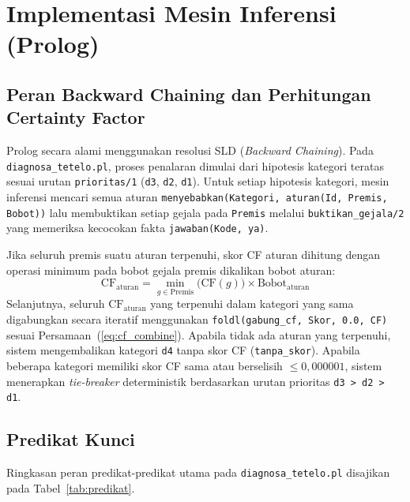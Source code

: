 \documentclass[12pt,a4paper]{report}
\begin{document}
\section{Implementasi Mesin Inferensi (Prolog)}

\subsection{Peran Backward Chaining dan Perhitungan Certainty Factor}
Prolog secara alami menggunakan resolusi SLD (\textit{Backward Chaining}). Pada \texttt{diagnosa\_tetelo.pl}, proses penalaran dimulai dari hipotesis kategori teratas sesuai urutan \texttt{prioritas/1} (\texttt{d3}, \texttt{d2}, \texttt{d1}). Untuk setiap hipotesis kategori, mesin inferensi mencari semua aturan \texttt{menyebabkan(Kategori, aturan(Id, Premis, Bobot))} lalu membuktikan setiap gejala pada \texttt{Premis} melalui \texttt{buktikan\_gejala/2} yang memeriksa kecocokan fakta \texttt{jawaban(Kode, ya)}.

Jika seluruh premis suatu aturan terpenuhi, skor CF aturan dihitung dengan operasi minimum pada bobot gejala premis dikalikan bobot aturan:
\begin{equation}
  \text{CF}_{\text{aturan}} = \min_{g \in \text{Premis}}\bigl(\text{CF}(g)\bigr) \times \text{Bobot}_{\text{aturan}}
  \label{eq:cf_rule}
\end{equation}
Selanjutnya, seluruh $\text{CF}_{\text{aturan}}$ yang terpenuhi dalam kategori yang sama digabungkan secara iteratif menggunakan \texttt{foldl(gabung\_cf, Skor, 0.0, CF)} sesuai Persamaan~(\ref{eq:cf_combine}). Apabila tidak ada aturan yang terpenuhi, sistem mengembalikan kategori \texttt{d4} tanpa skor CF (\texttt{tanpa\_skor}). Apabila beberapa kategori memiliki skor CF sama atau berselisih $\le 0{,}000001$, sistem menerapkan \textit{tie-breaker} deterministik berdasarkan urutan prioritas \texttt{d3 > d2 > d1}.

\subsection{Predikat Kunci}
Ringkasan peran predikat-predikat utama pada \texttt{diagnosa\_tetelo.pl} disajikan pada Tabel~\ref{tab:predikat}.
\end{document}
